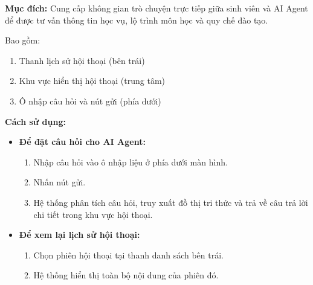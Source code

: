 \textbf{Mục đích:} Cung cấp không gian trò chuyện trực tiếp giữa sinh viên và AI Agent để được tư vấn thông tin học vụ, lộ trình môn học và quy chế đào tạo.

Bao gồm:
\begin{enumerate}
	\item Thanh lịch sử hội thoại (bên trái)
	\item Khu vực hiển thị hội thoại (trung tâm)
	\item Ô nhập câu hỏi và nút gửi (phía dưới)
\end{enumerate}

\textbf{Cách sử dụng:}
\begin{itemize}
	\item \textbf{Để đặt câu hỏi cho AI Agent:}
	\begin{enumerate}
		\item Nhập câu hỏi vào ô nhập liệu ở phía dưới màn hình.
		\item Nhấn nút gửi.
		\item Hệ thống phân tích câu hỏi, truy xuất đồ thị tri thức và trả về câu trả lời chi tiết trong khu vực hội thoại.
	\end{enumerate}
	\item \textbf{Để xem lại lịch sử hội thoại:}
	\begin{enumerate}
		\item Chọn phiên hội thoại tại thanh danh sách bên trái.
		\item Hệ thống hiển thị toàn bộ nội dung của phiên đó.
	\end{enumerate}
\end{itemize}
